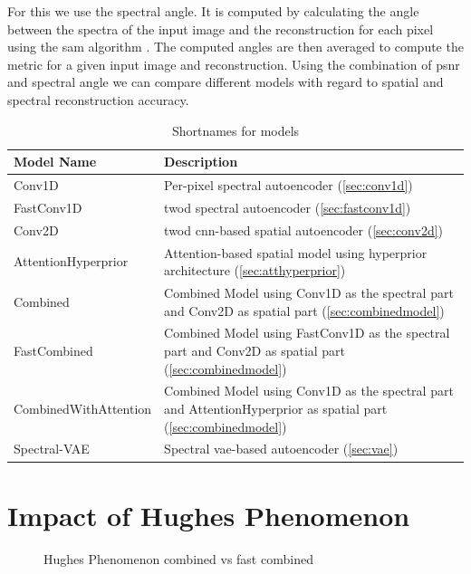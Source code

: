 For this we use the spectral angle. It is computed by calculating the angle between the spectra of the input image and the reconstruction for each pixel using the \ac{sam} algorithm \citep{kruse_spectral_1993}. The computed angles are then averaged to compute the metric for a given input image and reconstruction. Using the combination of \ac{psnr} and spectral angle we can compare different models with regard to spatial and spectral reconstruction accuracy.
\begin{table}
\centering
\begin{tabularx}{\textwidth}{|L|L|}
\hline
Model Name & Description \\
\hline\hline
Conv1D & Per-pixel spectral autoencoder (\autoref{sec:conv1d})\\
\hline
FastConv1D & \Ac{twod} spectral autoencoder (\autoref{sec:fastconv1d})\\
\hline
Conv2D & \Ac{twod} \ac{cnn}-based spatial autoencoder (\autoref{sec:conv2d})\\
\hline
AttentionHyperprior & Attention-based spatial model using hyperprior architecture (\autoref{sec:atthyperprior}) \\
\hline
Combined & Combined Model using Conv1D as the spectral part and Conv2D as spatial part (\autoref{sec:combinedmodel}) \\
\hline
FastCombined & Combined Model using FastConv1D as the spectral part and Conv2D as spatial part (\autoref{sec:combinedmodel}) \\
\hline
CombinedWithAttention & Combined Model using Conv1D as the spectral part and AttentionHyperprior as spatial part (\autoref{sec:combinedmodel}) \\
\hline
Spectral-VAE & Spectral \ac{vae}-based autoencoder (\autoref{sec:vae}) \\
\hline
\end{tabularx}
\label{fig:shortnames}
\caption{Shortnames for models}
\end{table}
\section{Impact of Hughes Phenomenon \label{sec:ch5hughes}}
\begin{figure}[!ht]
    \centering
{}\datatable
{}
\caption{Hughes Phenomenon combined vs fast combined}
\label{fig:hughes}
\end{figure}

